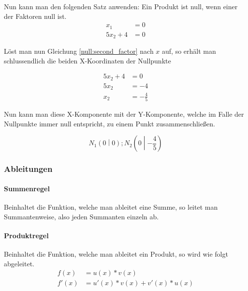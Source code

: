 \documentclass[a4paper]{article}
\begin{document}
				Nun kann man den folgenden Satz anwenden: Ein Produkt ist null, wenn einer der Faktoren null ist.\\
				
				\begin{align}
					x_1 &= 0\\
					5x_2 + 4 &= 0 \label{null:second_factor}
				\end{align}
				
				Löst man nun Gleichung \ref{null:second_factor} nach $x$ auf, so erhält man schlussendlich die beiden X-Koordinaten der Nullpunkte
				
				\begin{equation}
					\begin{split}
						5x_2 + 4 &= 0\\
						5x_2 &= -4\\
						x_2 &= -\frac{4}{5}
					\end{split}
				\end{equation}
				
				\noindent
				Nun kann man diese X-Komponente mit der Y-Komponente, welche im Falle der Nullpunkte immer null entspricht, zu einem Punkt zusammenschließen.
				
				\begin{equation}
					N_1\left(0\middle|0\right); 
					N_2\left(0\middle|-\frac{4}{5}\right)
				\end{equation}
				
			\subsubsection{Ableitungen}
				\paragraph{Summenregel}
					Beinhaltet die Funktion, welche man ableitet eine Summe, so leitet man Summantenweise, also jeden Summanten einzeln ab.
				
				\paragraph{Produktregel}
					Beinhaltet die Funktion, welche man ableitet ein Produkt, so wird wie folgt abgeleitet.
					\begin{subequations}
						\begin{align}
							f(x) &= u(x) * v(x)\\
							f'(x) &= u'(x) * v(x) + v'(x) * u(x)
						\end{align}
					\end{subequations}
				
\end{document}
